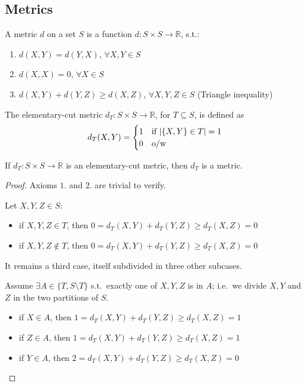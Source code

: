 \subsection{Metrics}

    \begin{definition}[Metric]
        A metric $d$ on a set $S$ is a function $d : S \times S \rightarrow \mathbb{R}$, s.t.:
        \begin{enumerate}
            \item $d(X,Y) = d(Y,X)$, $\forall X,Y \in S$
            \item $d(X,X) = 0$, $\forall X \in S$
            \item $d(X,Y) + d(Y,Z) \geq d(X,Z)$, $\forall X,Y,Z \in S$ (Triangle inequality)
        \end{enumerate}
    \end{definition}

    \begin{definition}
        The elementary-cut metric $d_T : S \times S \rightarrow \mathbb{R}$, for $T \subseteq S$, is defined as
        \begin{equation}
            d_T(X,Y) = 
            \begin{cases}
                1 & \text{if } \vert \{X,Y\} \in T  \vert = 1\\
                0 & \text{o/w}
            \end{cases}
        \end{equation}
    \end{definition}

    \begin{lemma}
        If $d_T : S \times S \rightarrow \mathbb{R}$ is an elementary-cut metric, then $d_T$ is a metric.
    \end{lemma}

    \begin{proof}
        Axioms $1.$ and $2.$ are trivial to verify.

        Let $X,Y,Z \in S$:
        \begin{itemize}
            \item if $X,Y,Z \in T$, then $0 = d_T(X,Y) + d_T(Y,Z) \geq d_T(X,Z) = 0$
            \item if $X,Y,Z \not\in T$, then $0 = d_T(X,Y) + d_T(Y,Z) \geq d_T(X,Z) = 0$
        \end{itemize}

        It remains a third case, itself subdivided in three other subcases.

        Assume $\exists A \in \{ T, S \setminus T \}$ s.t.~exactly one of $X,Y,Z$ is in $A$; i.e.~we divide $X,Y$ and $Z$ in the two partitions of $S$.
        \begin{itemize}
            \item if $X \in A$, then $1 = d_T(X,Y) + d_T(Y,Z) \geq d_T(X,Z) = 1$
            \item if $Z \in A$, then $1 = d_T(X,Y) + d_T(Y,Z) \geq d_T(X,Z) = 1$
            \item if $Y \in A$, then $2 = d_T(X,Y) + d_T(Y,Z) \geq d_T(X,Z) = 0$
        \end{itemize}
    \end{proof}

